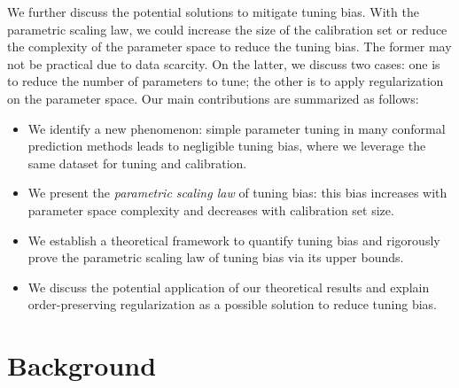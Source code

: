 \documentclass{article}
\newcommand{\1}{\mathbbm{1}}
\theoremstyle{plain}
\theoremstyle{definition}
\theoremstyle{remark}
\begin{document}
We further discuss the potential solutions to mitigate tuning bias. 
With the parametric scaling law, we could increase the size of the calibration set or reduce the complexity of the parameter space to reduce the tuning bias. 
The former may not be practical due to data scarcity. 
On the latter, we discuss two cases: one is to reduce the number of parameters to tune; the other is to apply regularization on the parameter space.  
Our main contributions are summarized as follows:

\begin{itemize}
    \item We identify a new phenomenon: simple parameter tuning in many conformal prediction methods leads to negligible tuning bias, where we leverage the same dataset for tuning and calibration.
    \item We present the \textit{parametric scaling law} of tuning bias: this bias increases with parameter space complexity and decreases with calibration set size.
    \item We establish a theoretical framework to quantify tuning bias and rigorously prove the parametric scaling law of tuning bias via its upper bounds.
    \item We discuss the potential application of our theoretical results and explain order-preserving regularization as a possible solution to reduce tuning bias. 
\end{itemize}



\section{Background}\label{sec:background}
\end{document}
